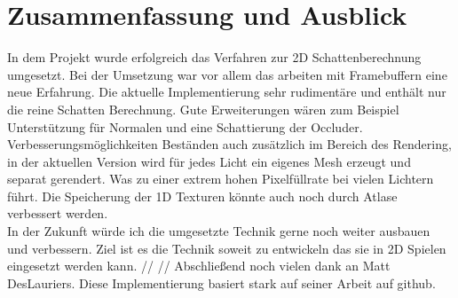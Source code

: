 \chapter{Zusammenfassung und Ausblick}
In dem Projekt wurde erfolgreich das Verfahren zur 2D Schattenberechnung umgesetzt.
Bei der Umsetzung war vor allem das arbeiten mit Framebuffern eine neue Erfahrung.
Die aktuelle Implementierung sehr rudimentäre und enthält nur die reine Schatten Berechnung.
Gute Erweiterungen wären zum Beispiel Unterstützung für Normalen und eine Schattierung der Occluder.
Verbesserungsmöglichkeiten Beständen auch zusätzlich im Bereich des Rendering, in der aktuellen Version wird für jedes Licht ein eigenes Mesh erzeugt und separat gerendert. Was zu einer extrem hohen Pixelfüllrate bei vielen Lichtern führt.
Die Speicherung der 1D Texturen könnte auch noch durch Atlase verbessert werden.\\
In der Zukunft würde ich die umgesetzte Technik gerne noch weiter ausbauen und verbessern.
Ziel ist es die Technik soweit zu entwickeln das sie in 2D Spielen eingesetzt werden kann.
//
//
Abschließend noch vielen dank an Matt DesLauriers. Diese Implementierung basiert stark auf seiner Arbeit auf github.\cite{mattdesl:13} 